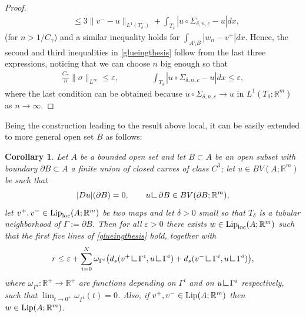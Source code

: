 \documentclass[a4paper,11pt]{article}
\numberwithin{equation}{section}
\newtheorem{cor}[theorem]{Corollary}
\newcommand{\R}{\mathbb{R}}
\newcommand{\res}      {\mathop{\hbox{\vrule height 7pt width .5pt depth
                        0pt\vrule height .5pt width 6pt depth 0pt}}\nolimits}
\begin{document}
\begin{proof}
\begin{align*}
&\leq 3 \|v^--u\|_{L^1(T_\delta^-)}+\int_{T_\delta}|u\circ\Sigma_{\delta,n,c}-u|dx,
\end{align*}
(for $n>1/C_\gamma$)
and a similar inequality holds for $\int_{A\setminus B}|w_n-v^+|dx$.
Hence, the second and third inequalities in \eqref{glueingthesis} follow from the last three expressions, noticing that we can choose $n$ big enough so that 
\begin{align*}
\frac {C_\gamma}{n}\|\sigma\|_{L^\infty}\leq \varepsilon,\qquad \qquad \int_{T_\delta}|u\circ\Sigma_{\delta,n,c}-u|dx\leq \varepsilon,
\end{align*}
where the last condition can be obtained because  $u\circ\Sigma_{\delta,n,c}\rightarrow u$ in $L^1(T_\delta;\R^m)$ as $n\rightarrow \infty$.
\end{proof}

Being the construction leading to the result above local, it can be easily extended to more general open set $B$ as follows:

\begin{cor}\label{cor_glueing1}
	Let $A$ be a bounded open set and let $B\subset A$ be an open subset with boundary  $\partial B\subset A$ a finite union of  closed curves of class $C^3$; let $u\in BV(A;\R^m)$ be such that$$|Du|(\partial B)=0,\qquad u\res\partial B\in BV(\partial B;\R^m),$$  let $v^+,v^-\in\text{{\rm Lip}}_{\text{{\rm loc}}}(A;\R^m)$ be two maps and let $\delta>0$ small so that $T_\delta$ is a tubular neighborhood of $\Gamma:=\partial B$. Then for all $\varepsilon>0$ there exists $w\in\text{{\rm Lip}}_{\text{{\rm loc}}}(A;\R^m)$  such that the first five lines of \eqref{glueingthesis} hold, together with
	\begin{align}
	r\leq\varepsilon+\sum_{i=0}^N\omega_{\Gamma^i}\big(d_s(v^+\res \Gamma^i,u\res\Gamma^i)+d_s(v^-\res \Gamma^i,u\res\Gamma^i)\big),\label{269}
	\end{align}
where $\omega_{\Gamma^i}:\R^+\rightarrow \R^+$ are functions depending on $\Gamma^i$ and on $u\res \Gamma^i$ respectively, such that $\lim_{t\rightarrow 0^+}\omega_{\Gamma^i}(t)=0$. Also, if $v^+,v^-\in\text{{\rm Lip}}(A;\R^m)$ then $w\in \text{{\rm Lip}}(A;\R^m)$.
\end{cor}
\end{document}
